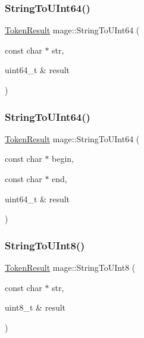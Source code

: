 \hypertarget{namespacemage_a9ed31e3340a769a654f1f819c368bb6d}{}\label{namespacemage_a9ed31e3340a769a654f1f819c368bb6d} 
\subsubsection{\texorpdfstring{String\+To\+U\+Int64()}{StringToUInt64()}\hspace{0.1cm}{\footnotesize\ttfamily [1/2]}}
{\footnotesize\ttfamily \hyperlink{namespacemage_a2178ba2411db5912f41b2e7698c2037d}{Token\+Result} mage\+::\+String\+To\+U\+Int64 (\begin{DoxyParamCaption}\item[{const char $\ast$}]{str,  }\item[{uint64\+\_\+t \&}]{result }\end{DoxyParamCaption})}

\hypertarget{namespacemage_a8e3b6a19a6ab9e7c905150352b8ab0ea}{}\label{namespacemage_a8e3b6a19a6ab9e7c905150352b8ab0ea} 
\subsubsection{\texorpdfstring{String\+To\+U\+Int64()}{StringToUInt64()}\hspace{0.1cm}{\footnotesize\ttfamily [2/2]}}
{\footnotesize\ttfamily \hyperlink{namespacemage_a2178ba2411db5912f41b2e7698c2037d}{Token\+Result} mage\+::\+String\+To\+U\+Int64 (\begin{DoxyParamCaption}\item[{const char $\ast$}]{begin,  }\item[{const char $\ast$}]{end,  }\item[{uint64\+\_\+t \&}]{result }\end{DoxyParamCaption})}

\hypertarget{namespacemage_ad3cfd1fdffefa1f3f793b7612de11770}{}\label{namespacemage_ad3cfd1fdffefa1f3f793b7612de11770} 
\subsubsection{\texorpdfstring{String\+To\+U\+Int8()}{StringToUInt8()}\hspace{0.1cm}{\footnotesize\ttfamily [1/2]}}
{\footnotesize\ttfamily \hyperlink{namespacemage_a2178ba2411db5912f41b2e7698c2037d}{Token\+Result} mage\+::\+String\+To\+U\+Int8 (\begin{DoxyParamCaption}\item[{const char $\ast$}]{str,  }\item[{uint8\+\_\+t \&}]{result }\end{DoxyParamCaption})}

